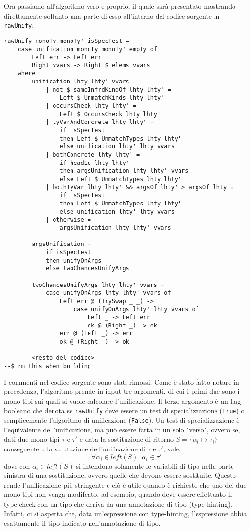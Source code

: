 \documentclass[10pt,a4paper]{article}
\begin{document}
Ora passiamo all'algoritmo vero e proprio, il quale sarà presentato mostrando direttamente soltanto una parte di esso
all'interno del codice sorgente in \texttt{rawUnify}:
\begin{lstlisting}
rawUnify monoTy monoTy' isSpecTest =
    case unification monoTy monoTy' empty of
        Left err -> Left err
        Right vvars -> Right $ elems vvars
    where
        unification lhty lhty' vvars
            | not $ sameInfrdKindOf lhty lhty' =
                Left $ UnmatchKinds lhty lhty'
            | occursCheck lhty lhty' =
                Left $ OccursCheck lhty lhty'
            | tyVarAndConcrete lhty lhty' =
                if isSpecTest
                then Left $ UnmatchTypes lhty lhty'
                else unification lhty' lhty vvars
            | bothConcrete lhty lhty' =
                if headEq lhty lhty'
                then argsUnification lhty lhty' vvars
                else Left $ UnmatchTypes lhty lhty'
            | bothTyVar lhty lhty' && argsOf lhty' > argsOf lhty =
                if isSpecTest
                then Left $ UnmatchTypes lhty lhty'
                else unification lhty' lhty vvars
            | otherwise =
                argsUnification lhty lhty' vvars

        argsUnification =
            if isSpecTest
            then unifyOnArgs
            else twoChancesUnifyArgs

        twoChancesUnifyArgs lhty lhty' vvars =
            case unifyOnArgs lhty lhty' vvars of
                Left err @ (TrySwap _ _) ->
                    case unifyOnArgs lhty' lhty vvars of
                        Left _ -> Left err
                        ok @ (Right _) -> ok
                err @ (Left _) -> err
                ok @ (Right _) -> ok

        <resto del codice>
--$ rm this when building
\end{lstlisting}
I commenti nel codice sorgente sono stati rimossi. Come è stato fatto notare in precedenza,
l'algoritmo prende in input tre argomenti, di cui i primi due sono i mono-tipi sui quali si vuole calcolare l'unificazione.
Il terzo argomento è un flag booleano che denota se \texttt{rawUnify} deve essere un test di specializzazione
(\texttt{True}) o semplicemente l'algoritmo di unificazione (\texttt{False}). Un test di specializzazione è l'equivalente
dell'unificazione, ma può essere fatta in un solo "verso", ovvero se, dati due mono-tipi $ \tau $ e $ \tau' $ e data
la sostituzione di ritorno $ S = \{ \alpha_i \mapsto \tau_i \} $ conseguente alla valutazione dell'unificazione di
$ \tau $ e $ \tau' $, vale:
\[ \forall \alpha_i \in left(S). \; \alpha_i \in \tau' \]
dove con $ \alpha_i \in left(S) $ si intendono solamente le variabili di tipo nella parte sinistra di una sostituzione,
ovvero quelle che devono essere sostituite. Questo rende l'unificazione più stringente
e ciò è utile quando è richiesto che uno dei due mono-tipi non venga modifcato,
ad esempio, quando deve essere effettuato il type-check con un tipo che deriva da una annotazione di tipo (type-hinting).
Infatti, ci si aspetta che, data un'espressione con type-hinting, l'espressione abbia esattamente il tipo indicato
nell'annotazione di tipo.
\end{document}
